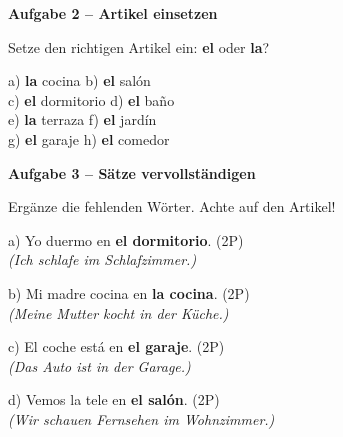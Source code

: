\documentclass[11pt, a4paper]{article}
\newcommand{\fachfarbe}{spanisch}
\newcommand{\punktebox}[1]{\hfill\fbox{\small \_/#1}}
\newcommand{\lsg}[1]{\textcolor{loesung}{\textbf{#1}}}
\newenvironment{aufgabe}[1]{%
    \needspace{5\baselineskip}%
    \nopagebreak[4]%
    \vspace{10pt}
    \noindent\textbf{\textcolor{\fachfarbe}{Aufgabe #1}}
    \nopagebreak[4]%
    \vspace{5pt}
    \nopagebreak[4]%
    \begin{list}{}{\leftmargin=0pt}
    \item[]
}{%
    \end{list}
}
\newcommand{\es}[1]{\textcolor{\fachfarbe}{\textbf{#1}}}
\begin{document}
\vspace{15pt}


\begin{aufgabe}{2 -- Artikel einsetzen}
Setze den richtigen Artikel ein: \es{el} oder \es{la}? \punktebox{8}
\end{aufgabe}

\noindent
a) \lsg{la} cocina \hfill
b) \lsg{el} salón \\[0.8em]
c) \lsg{el} dormitorio \hfill
d) \lsg{el} baño \\[0.8em]
e) \lsg{la} terraza \hfill
f) \lsg{el} jardín \\[0.8em]
g) \lsg{el} garaje \hfill
h) \lsg{el} comedor \\

\vspace{15pt}


\begin{aufgabe}{3 -- Sätze vervollständigen}
Ergänze die fehlenden Wörter. Achte auf den Artikel! \punktebox{10}
\end{aufgabe}

\noindent
a) Yo duermo en \lsg{el dormitorio}. \hfill (2P) \\
\hspace*{0.5cm}\textit{(Ich schlafe im Schlafzimmer.)}

\vspace{0.8em}

\noindent
b) Mi madre cocina en \lsg{la cocina}. \hfill (2P) \\
\hspace*{0.5cm}\textit{(Meine Mutter kocht in der Küche.)}

\vspace{0.8em}

\noindent
c) El coche está en \lsg{el garaje}. \hfill (2P) \\
\hspace*{0.5cm}\textit{(Das Auto ist in der Garage.)}

\vspace{0.8em}

\noindent
d) Vemos la tele en \lsg{el salón}. \hfill (2P) \\
\hspace*{0.5cm}\textit{(Wir schauen Fernsehen im Wohnzimmer.)}
\end{document}

